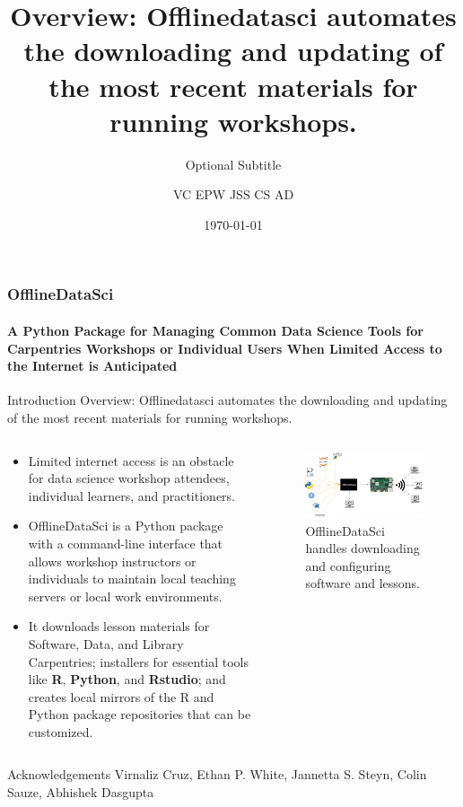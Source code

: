 \documentclass[
	8pt,
]{beamer}
\title[OfflineDataSci]{Overview: Offlinedatasci automates the downloading and updating of the most recent materials for running workshops.}
\subtitle{Optional Subtitle}
\author[VC EPW JSS CS AD]{VC EPW JSS CS AD}
\date[\today]{\today}
\begin{document}
\begin{frame}
	\frametitle{OfflineDataSci}
	\framesubtitle{A Python Package for Managing Common Data Science Tools for Carpentries Workshops or Individual Users When Limited Access to the Internet is Anticipated}
	\begin{block}{Introduction}
	Overview: Offlinedatasci automates the downloading and updating of the most recent materials for running workshops.
	\end{block}	
	\begin{columns}[t]
		\begin{column}{0.6\textwidth} %
		
			\begin{itemize}
   				\item Limited internet access is an obstacle for data science workshop attendees, individual learners, and practitioners.
       
				\item OfflineDataSci is a Python package with a command-line interface that allows workshop instructors or individuals to maintain local teaching servers or local work environments.
				
				\item It downloads lesson materials for Software, Data, and Library Carpentries; installers for essential tools like \textbf{R}, \textbf{Python}, and \textbf{Rstudio}; and creates local mirrors of the R and Python package repositories that can be customized.
    
			\end{itemize}
		\end{column}
		
		\begin{column}{0.4\textwidth} %
			\begin{figure}
				\includegraphics[width=1\linewidth]{offlinedatasci.png}
				\caption{OfflineDataSci handles downloading and configuring software and lessons.}
			\end{figure}
		\end{column}
	\end{columns}
	\begin{block}{Acknowledgements}
		Virnaliz Cruz, Ethan P. White, Jannetta S. Steyn, Colin Sauze, Abhishek Dasgupta
	\end{block}
\end{frame}
\end{document}

